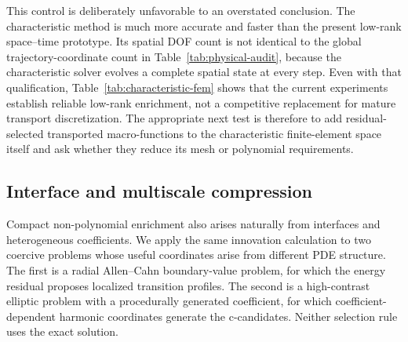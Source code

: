 \documentclass[11pt]{article}
\numberwithin{algorithm}{section}
\theoremstyle{definition}\newtheorem{definition}[theorem]{Definition}
\theoremstyle{remark}\newtheorem{remark}[theorem]{Remark}
\begin{document}
\begin{table}[h]
\centering
\caption{Genuine P1/P2 characteristic finite-element baseline for the
12-step blinking-vortex problem.  The errors are measured against a periodic
P2 solve on a $40\times40$ mesh.}
\label{tab:characteristic-fem}
\end{table}

This control is deliberately unfavorable to an overstated conclusion.  The
characteristic method is much more accurate and faster than the present
low-rank space--time prototype.  Its spatial DOF count is not identical to the
global trajectory-coordinate count in Table~\ref{tab:physical-audit}, because
the characteristic solver evolves a complete spatial state at every step.
Even with that qualification, Table~\ref{tab:characteristic-fem} shows that the
current experiments establish reliable low-rank enrichment, not a competitive
replacement for mature transport discretization.  The appropriate next test
is therefore to add residual-selected transported macro-functions to the
characteristic finite-element space itself and ask whether they reduce its
mesh or polynomial requirements.

\subsection{Interface and multiscale compression}
Compact non-polynomial enrichment also arises naturally from interfaces and
heterogeneous coefficients.  We apply the same innovation calculation to two
coercive problems whose useful coordinates arise from different PDE
structure.  The first is a radial Allen--Cahn boundary-value problem, for which
the energy residual proposes localized transition profiles.  The second is a
high-contrast elliptic problem with a procedurally generated coefficient, for
which coefficient-dependent harmonic coordinates generate the c-candidates.
Neither selection rule uses the exact solution.
\end{document}
